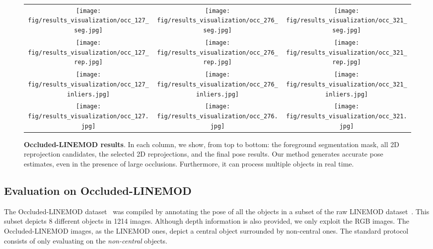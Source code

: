 \documentclass[10pt,twocolumn,letterpaper]{article}
\begin{document}
\begin{figure*}[htbp]
	\centering
	\begin{tabular}{ccc}
	\texttt{[image: fig/results\_visualization/occ\_127\_seg.jpg]} &
	\texttt{[image: fig/results\_visualization/occ\_276\_seg.jpg]} &
	\texttt{[image: fig/results\_visualization/occ\_321\_seg.jpg]} \\
	\texttt{[image: fig/results\_visualization/occ\_127\_rep.jpg]} &
	\texttt{[image: fig/results\_visualization/occ\_276\_rep.jpg]} &
	\texttt{[image: fig/results\_visualization/occ\_321\_rep.jpg]} \\
	\texttt{[image: fig/results\_visualization/occ\_127\_inliers.jpg]} &
	\texttt{[image: fig/results\_visualization/occ\_276\_inliers.jpg]} &
	\texttt{[image: fig/results\_visualization/occ\_321\_inliers.jpg]} \\
	\texttt{[image: fig/results\_visualization/occ\_127.jpg]} &
	\texttt{[image: fig/results\_visualization/occ\_276.jpg]} &
	\texttt{[image: fig/results\_visualization/occ\_321.jpg]} \\
	\end{tabular}
	\vspace{-2mm}
	\caption{{\bf Occluded-LINEMOD results}. In each column, we show, from top to bottom: the foreground segmentation mask, all 2D reprojection candidates, the selected 2D reprojections, and the final pose results. Our method generates accurate pose estimates, even in the presence of large occlusions. Furthermore, it can process multiple objects in real time.}
	\label{fig:results_visualization_occ}
\end{figure*} 
 
\subsection{Evaluation on Occluded-LINEMOD}
\label{sec:eval_occlinemod}

The Occluded-LINEMOD dataset~\cite{Krull15} was compiled by annotating the pose of all the objects in a subset of the raw LINEMOD dataset~\cite{Hinterstoisser12b}. This subset depicts 8 different objects in 1214 images. Although depth information is also provided, we only exploit the RGB images. The Occluded-LINEMOD images, as the LINEMOD ones, depict a central object surrounded by non-central ones. The standard protocol consists of only evaluating on the {\it non-central} objects.
\end{document}
